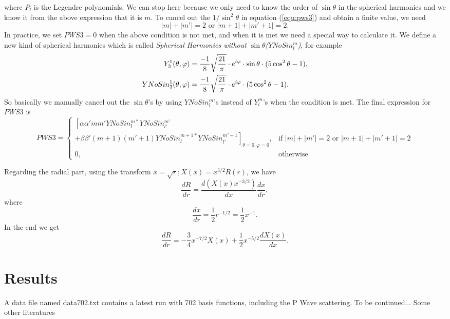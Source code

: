 \documentclass[british,english]{article}
\numberwithin{equation}{section}
\numberwithin{figure}{section}
\begin{document}
where $P_l$ is the Legendre polynomials. We can stop here because we only need to know the order of $\sin \theta$ in the spherical harmonics and we know it from the above expression that it is $m$. To cancel out the $1/\sin ^2 \theta$ in equation (\ref{equ:pws3}) and obtain a finite value, we need
\begin{equation} 
|m|+|m'|=2 \text{ or } |m+1|+|m'+1|=2.
\end{equation}
 In practice, we set $PWS3=0$ when the above condition is not met, and when it is met we need a special way to calculate it. We define a new kind of spherical harmonics which is called \emph{Spherical Harmonics without $\sin \theta$($YNoSin_l^m$)}, for example
\begin{equation}
\begin{aligned}
Y_{3}^{1}(\theta ,\varphi )&={-1 \over 8}{\sqrt {21 \over \pi }}\cdot e^{i\varphi }\cdot \sin \theta \cdot (5\cos ^{2}\theta -1),\\
YNoSin_{3}^{1}(\theta ,\varphi )&={-1 \over 8}{\sqrt {21 \over \pi }}\cdot e^{i\varphi }\cdot (5\cos ^{2}\theta -1).
\end{aligned}
\end{equation}
So basically we manually cancel out the $\sin \theta$'s by using $YNoSin_l^m$'s instead of $Y_l^m$'s when the condition is met. The final expression for $PWS3$ is
\begin{equation}
PWS3=
\begin{cases}
   \left[\alpha\alpha'mm'YNoSin_l^{m*} YNoSin_{l'}^{m'}\right.\\
   +\left.\beta\beta'(m+1)(m'+1)YNoSin_{l}^{m+1*}YNoSin_{l'}^{m'+1}\right]_{\theta=0,\varphi=0} ,& \text{if } |m|+|m'|=2 \text{ or } |m+1|+|m'+1|=2\\
    0,              & \text{otherwise}
\end{cases}
\end{equation}

Regarding the radial part, using the transform $x=\sqrt{r}; X(x)=x^{3/2}R(r)$, we have
$$\frac{dR}{dr}=\frac{d (X(x)x^{-3/2})}{dx}\frac{dx}{dr},$$  
where 
 $$\frac{dx}{dr}=\frac12 r^{-1/2}=\frac{1}{2}x^{-1}.$$
In the end we get 
$$\frac{dR}{dr}=-\frac 34 x^{-7/2}X(x)+\frac 12 x^{-5/2}\frac{dX(x)}{dx}.$$
\section{Results}
A data file named data702.txt contains a latest run with 702 basis functions, including the P Wave scattering. To be continued... 
Some other literatures\cite{Balewski2014,Bendkowsky2009,Kurz2013,Bendkowsky2010}


\end{document}
